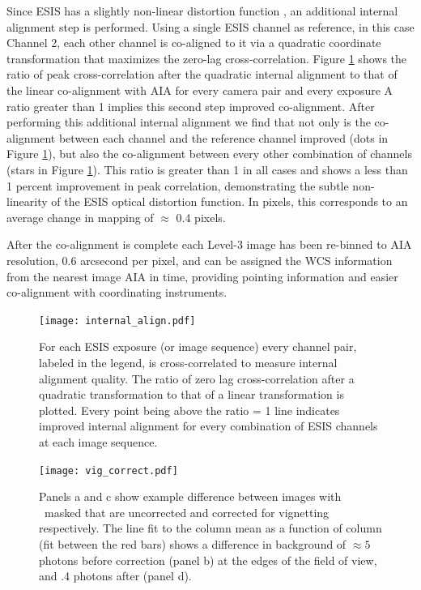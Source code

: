 Since ESIS has a slightly non-linear distortion function \citep{ESIS}, an additional internal alignment step is performed.
Using a single ESIS channel as reference, in this case Channel 2, each other channel is co-aligned to it via a quadratic coordinate transformation that maximizes the zero-lag cross-correlation. 
Figure \ref{fig:cc} shows the ratio of peak cross-correlation after the quadratic internal alignment to that of the linear co-alignment with AIA for every camera pair and every exposure
A ratio greater than 1 implies this second step improved co-alignment.
After performing this additional internal alignment we find that not only is the co-alignment between each channel and the reference channel improved (dots in Figure \ref{fig:cc}), but also the co-alignment between every other combination of channels (stars in Figure \ref{fig:cc}).
This ratio is greater than 1 in all cases and shows a less than 1 percent improvement in peak correlation, demonstrating the subtle non-linearity of the ESIS optical distortion function.
In pixels, this corresponds to an average change in mapping of $\approx$ 0.4 pixels.

After the co-alignment is complete each Level-3 image has been re-binned to AIA resolution, 0.6 arcsecond per pixel, and can be assigned the WCS information \citep{WCS} from the nearest image AIA in time, providing pointing information and easier co-alignment with coordinating instruments.



 \begin{figure}[htb!]
	\centering
	\texttt{[image: internal\_align.pdf]}
	\caption{For each ESIS exposure (or image sequence) every channel pair, labeled in the legend, is cross-correlated to measure internal alignment quality.  The ratio of zero lag cross-correlation after a quadratic transformation to that of a linear transformation is plotted.  Every point being above the ratio = 1 line indicates improved internal alignment for every combination of ESIS channels at each image sequence.}
	\label{fig:cc}	
\end{figure}

 \begin{figure}[htb!]
	\centering
	\texttt{[image: vig\_correct.pdf]}
	\caption{Panels a and c show example difference between images with \mgxbright \ masked that are uncorrected and corrected for vignetting respectively.  The line fit to the column mean as a function of column (fit between the red bars) shows a difference in background of $\approx 5$ photons before correction (panel b) at the edges of the field of view, and .4 photons after (panel d). }
	\label{fig:vig_correct}
\end{figure}

